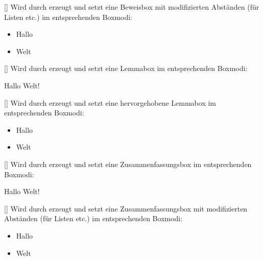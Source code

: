 %
%
%

[]
Wird durch  erzeugt und setzt eine Beweisbox mit modifizierten Abständen (für Listen etc.) im entsprechenden Boxmodi:
\begin{latex}
\begin{beweis*}[Hallo]
   \begin{itemize}
       \item Hallo
       \item Welt
   \end{itemize}
\end{beweis*}
\end{latex}

%
%
%

[]
Wird durch  erzeugt und setzt eine Lemmabox im entsprechenden Boxmodi:
\begin{latex}
\begin{lemma}[Hallo]
   Hallo Welt!
\end{lemma}
\end{latex}

%
%
%

[]
Wird durch  erzeugt und setzt eine hervorgehobene Lemmabox im entsprechenden Boxmodi:
\begin{latex}
\begin{lemma*}[Hallo]
   \begin{itemize}
       \item Hallo
       \item Welt
   \end{itemize}
\end{lemma*}
\end{latex}

%
%
%

[]
Wird durch  erzeugt und setzt eine Zusammenfassungsbox im entsprechenden Boxmodi:
\begin{latex}
\begin{zusammenfassung}[Hallo]
   Hallo Welt!
\end{zusammenfassung}
\end{latex}

%
%
%

[]
Wird durch  erzeugt und setzt eine Zusammenfassungsbox mit modifizierten Abständen (für Listen etc.) im entsprechenden Boxmodi:
\begin{latex}
\begin{zusammenfassung*}[Hallo]
   \begin{itemize}
       \item Hallo
       \item Welt
   \end{itemize}
\end{zusammenfassung*}
\end{latex}

